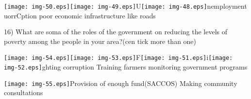 \documentclass[12pt]{article}
\begin{document}
\texttt{[image: img-50.eps]}\texttt{[image: img-49.eps]}U\texttt{[image: img-48.eps]}nemployment
       uorrCption         poor economic infrastructure like roads

16) What are soma of the roles of the government on reducing the levels of
poverty among         the people in your area?(cen tick more than one)

\texttt{[image: img-54.eps]}\texttt{[image: img-53.eps]}F\texttt{[image: img-51.eps]}i\texttt{[image: img-52.eps]}ghting
corruption         Training farmers                monitoring government programs

\texttt{[image: img-55.eps]}Provision of enough fund(SACCOS)        
 Making community consultations
\end{document}
